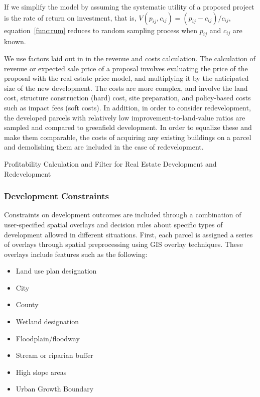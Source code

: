 If we simplify the model by assuming the systematic utility
of a proposed project is the rate of return on investment,
that is, $V(p_{ij}, c_{ij}) = (p_{ij} - c_{ij}) / c_{ij}$,
equation~\ref{func:rum} reduces to random sampling process when
$p_{ij}$ and $c_{ij}$ are known.

We use factors laid out in \cite{Waddell2001a} in the
revenue and costs calculation.  The calculation of revenue
or expected sale price of a proposal involves evaluating the
price of the proposal with the real estate price model, and
multiplying it by the anticipated size of the new
development.  The costs are more complex, and involve
the land cost, structure construction (hard) cost, site
preparation, and policy-based costs such as impact fees
(soft costs).  In addition, in order to consider
redevelopment, the developed parcels with relatively low
improvement-to-land-value ratios are sampled and compared to
greenfield development.  In order to equalize these and make
them comparable, the costs of acquiring any existing
buildings on a parcel and demolishing them are included in
the case of redevelopment.

\begin{table}[h]
\label{tab:profit-filter}
\begin{center}
  \caption{Profitability Calculation and Filter for Real
    Estate Development and Redevelopment }

\end{center}
\end{table}


\subsubsection{Development Constraints} \label{sec-development-constraints}
Constraints on development outcomes are included through a
combination of user-specified spatial overlays and decision rules
about specific types of development allowed in different
situations.  First, each parcel is assigned a series of overlays
through spatial preprocessing using GIS overlay techniques.  These
overlays include features such as the following:

\begin{itemize}
\item  Land use plan designation
\item  City
\item  County
\item  Wetland designation
\item  Floodplain/floodway
\item  Stream or riparian buffer
\item  High slope areas
\item  Urban Growth Boundary
\end{itemize}

